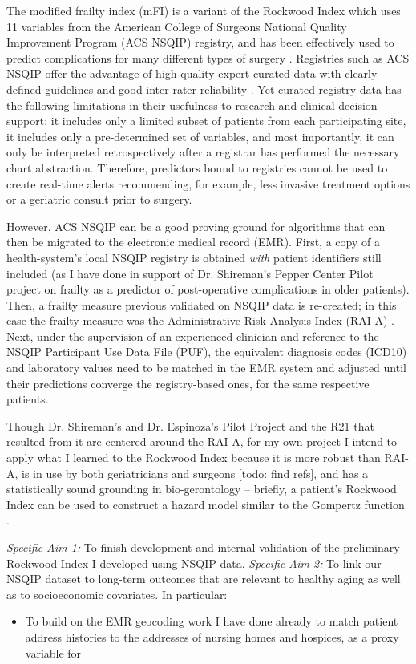 The modified frailty index (mFI) is a variant of the Rockwood Index which uses 11 variables from the American College of Surgeons National Quality Improvement Program (ACS NSQIP) registry, and has been effectively used to predict complications for many different types of surgery \cite{Uppal_2015,Tsiouris_2013,Bellamy_2017,22491599,23711971,23949353}. Registries such as ACS NSQIP offer the advantage of high quality expert-curated data with clearly defined guidelines and good inter-rater reliability \cite{Shiloach_2010}. Yet curated registry data has the following limitations in their usefulness to research and clinical decision support: it includes only a limited subset of patients from each participating site, it includes only a pre-determined set of variables, and most importantly, it can only be interpreted retrospectively after a registrar has performed the necessary chart abstraction. Therefore, predictors bound to registries cannot be used to create real-time alerts recommending, for example, less invasive treatment options or a geriatric consult prior to surgery.

However, ACS NSQIP can be a good proving ground for algorithms that can then be migrated to the electronic medical record (EMR). First, a copy of a health-system's local NSQIP registry is obtained \textit{with} patient identifiers still included (as I have done in support of Dr. Shireman's Pepper Center Pilot project on frailty as a predictor of post-operative complications in older patients). Then, a frailty measure previous validated on NSQIP data is re-created; in this case the frailty measure was the Administrative Risk Analysis Index (RAI-A) \cite{Hall_2017,Johnson_2014,Melin_2015,Gupta_2011}. Next, under the supervision of an experienced clinician and reference to the NSQIP Participant Use Data File (PUF), the equivalent diagnosis codes (ICD10) and laboratory values need to be matched in the EMR system and adjusted until their predictions converge the registry-based ones, for the same respective patients.

Though Dr. Shireman's and Dr. Espinoza's Pilot Project and the R21 that resulted from it are centered around the RAI-A, for my own project I intend to apply what I learned to the Rockwood Index because it is more robust than RAI-A, is in use by both geriatricians and surgeons [todo: find refs], and has a statistically sound grounding in bio-gerontology -- briefly, a patient's Rockwood Index can be used to construct a hazard model  \cite{Mitnitski_2001} similar to the Gompertz function \cite{Mueller_1995,Pletcher_2000,Bokov_2017}.

\emph{Specific Aim 1:} To finish development and internal validation of the preliminary Rockwood Index I developed using NSQIP data.
\emph{Specific Aim 2:} To link our NSQIP dataset to long-term outcomes that are relevant to healthy aging as well as to socioeconomic covariates. In particular:
\begin{itemize}
\item To build on the EMR geocoding work I have done already to match patient address histories to the addresses of nursing homes and hospices, as a proxy variable for 
\
\end{itemize}
